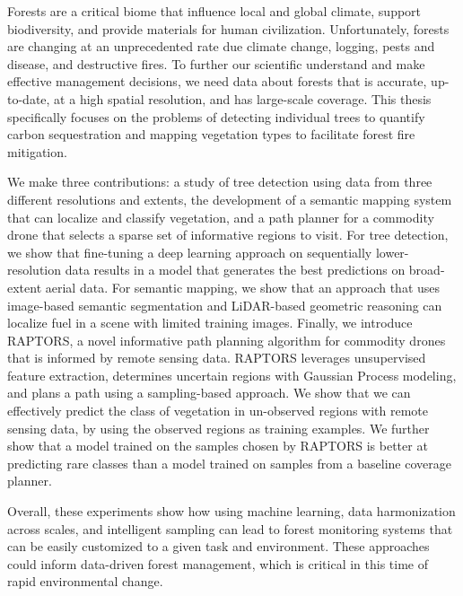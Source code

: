 
\setlength{\parskip}{1em}
\setlength{\parindent}{0em}
Forests are a critical biome that influence local and global climate, support biodiversity, and provide materials for human civilization. Unfortunately, forests are changing at an unprecedented rate due climate change, logging, pests and disease, and destructive fires. To further our scientific understand and make effective management decisions, we need data about forests that is accurate, up-to-date, at a high spatial resolution, and has large-scale coverage. This thesis specifically focuses on the problems of detecting individual trees to quantify carbon sequestration and mapping vegetation types to facilitate forest fire mitigation.

We make three contributions: a study of tree detection using data from three different resolutions and extents, the development of a semantic mapping system that can localize and classify vegetation, and a path planner for a commodity drone that selects a sparse set of informative regions to visit.
For tree detection, we show that fine-tuning a deep learning approach on sequentially lower-resolution data results in a model that generates the best predictions on broad-extent aerial data. For semantic mapping, we show that an approach that uses image-based semantic segmentation and LiDAR-based geometric reasoning can localize fuel in a scene with limited training images. Finally, we introduce RAPTORS, a novel informative path planning algorithm for commodity drones that is informed by remote sensing data. RAPTORS leverages unsupervised feature extraction, determines uncertain regions with Gaussian Process modeling, and plans a path using a sampling-based approach. We show that we can effectively predict the class of vegetation in un-observed regions with remote sensing data, by using the observed regions as training examples. We further show that a model trained on the samples chosen by RAPTORS is better at predicting rare classes than a model trained on samples from a baseline coverage planner.

Overall, these experiments show how using machine learning, data harmonization across scales, and intelligent sampling can lead to forest monitoring systems that can be easily customized to a given task and environment. These approaches could inform data-driven forest management, which is critical in this time of rapid environmental change.

